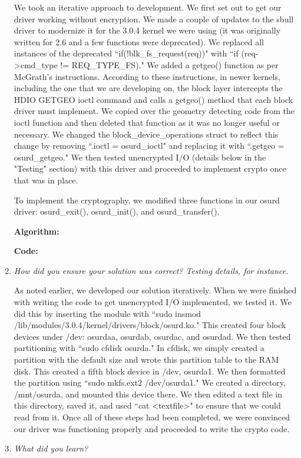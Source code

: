\documentclass[letterpaper,10pt,titlepage]{article}
\newcommand{\tab}{\hspace*{2em}} %
\begin{document}
\begin{enumerate}
\tab We took an iterative approach to development. We first set out to get our driver working without encryption. We made a couple of updates to the sbull driver to modernize it for the 3.0.4 kernel we were using (it was originally written for 2.6 and a few functions were deprecated). We replaced all instances of the deprecated ``if(!blk\_fs\_request(req))" with ``if (req->cmd_type != REQ\_TYPE\_FS)." We added a getgeo() function as per McGrath's instructions. According to these instructions, in newer kernels, including the one that we are developing on, the block layer intercepts the HDIO GETGEO ioctl command and calls a getgeo() method that each block driver must implement. We copied over the geometry detecting code from the ioctl function and then deleted that function as it was no longer useful or necessary. We changed the block_device_operations struct to reflect this change by removing ``.ioctl = osurd\_ioctl" and replacing it with ``.getgeo = osurd\_getgeo." We then tested unencrypted I/O (details below in the "Testing" section) with this driver and proceeded to implement crypto once that was in place.

\tab To implement the cryptography, we modified three functions in our osurd driver: osurd\_exit(), osurd\_init(), and osurd\_transfer(). 


\tab \textbf{Algorithm:} 

\tab \textbf{Code:}

\item \emph{How did you ensure your solution was correct? Testing details, for instance.}

\tab As noted earlier, we developed our solution iteratively. When we were finished with writing the code to get unencrypted I/O implemented, we tested it. We did this by inserting the module with ``sudo insmod /lib/modules/3.0.4/kernel/drivers/block/osurd.ko." This created four block devices under /dev: osurdaa, osurdab, osurdac, and osurdad. We then tested partitioning with ``sudo cfdisk osurda." In cfdisk, we simply created a partition with the default size and wrote this partition table to the RAM disk. This created a fifth block device in /dev, osurda1. We then formatted the partition using ``sudo mkfs.ext2 /dev/osurda1." We created a directory, /mnt/osurda, and mounted this device there. We then edited a text file in this directory, saved it, and used ``cat <textfile>" to ensure that we could read from it. Once all of these steps had been completed, we were convinced our driver was functioning properly and proceeded to write the crypto code.

\tab  

\item \emph{What did you learn?}

\end{enumerate}

%
\end{document}
